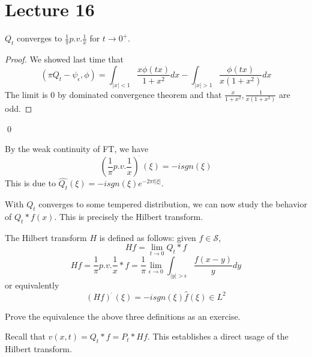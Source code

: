 \section{Lecture 16}
\begin{proposition}
    $Q_t$ converges to $\frac{1}{\pi}p.v.\frac{1}{x}$ for $t\to 0^+$.
\end{proposition}
\begin{proof}
    We showed last time that
    \begin{equation*}
        (\pi Q_t-\psi_\epsilon,\phi)=\int_{|x|<1}\frac{x\phi(tx)}{1+x^2}dx-\int_{|x|>1}\frac{\phi(tx)}{x(1+x^2)}dx
    \end{equation*}
    The limit is 0 by dominated convergence theorem and that $\frac{x}{1+x^2},\frac{1}{x(1+x^2)}$ are odd.
\end{proof}
\qed

By the weak continuity of FT, we have
\begin{equation*}
    \left(\frac{1}{\pi}p.v.\frac{1}{x}\right)^{\widehat{\phantom{.}}}(\xi)=-isgn(\xi)
\end{equation*}
This is due to $\widehat{Q_t}(\xi)=-isgn(\xi)e^{-2\pi t|\xi|}$. 

With $Q_t$ converges to some tempered distribution, we can now study the behavior of $Q_t\ast f(x)$. This is precisely the Hilbert transform.
\begin{definition}
    The Hilbert transform $H$ is defined as follows: given $f\in\mathcal{S}$,
    \begin{equation*}
        Hf=\lim_{t\to0}Q_t\ast f
    \end{equation*}
    \begin{equation*}
        Hf=\frac{1}{\pi}p.v.\frac{1}{x}\ast f=\frac{1}{\pi}\lim_{\epsilon\to 0}\int_{|y|>\epsilon}\frac{f(x-y)}{y}dy
    \end{equation*}
    or equivalently
    \begin{equation*}
        (Hf)^{\widehat{\phantom{.}}}(\xi)=-isgn(\xi)\hat{f}(\xi)\in L^2
    \end{equation*}
\end{definition}
\begin{exercise}
    Prove the equivalence the above three definitions as an exercise.
\end{exercise}

\begin{remark}
    Recall that $v(x,t)=Q_t\ast f=P_t\ast Hf$. This establishes a direct usage of the Hilbert transform.
\end{remark}

